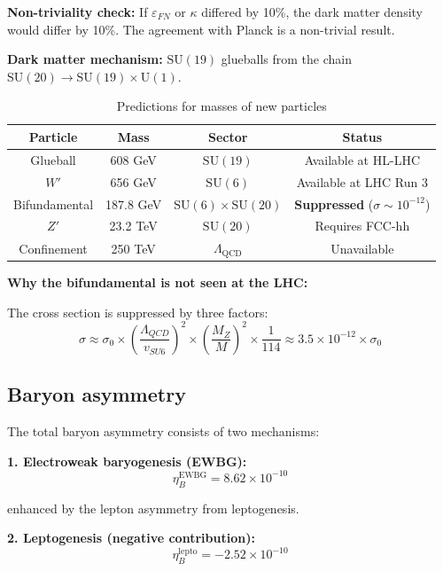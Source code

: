 \documentclass[12pt,a4paper,twoside]{article}
\newcommand{\SU}{\mathrm{SU}}
\newcommand{\Uone}{\mathrm{U}(1)}
\newcommand{\EPS}{\varepsilon}
\theoremstyle{definition}
\begin{document}
\textbf{Non-triviality check:} If $\EPS_{FN}$ or $\kappa$ differed by 10\%, the dark matter density would differ by 10\%. The agreement with Planck is a non-trivial result.

\textbf{Dark matter mechanism:} $\SU(19)$ glueballs from the chain $\SU(20) \to \SU(19) \times \Uone$.

\begin{table}[H]
\centering
\small
\caption{Predictions for masses of new particles}
\label{tab:new_particles}
\begin{tabular}{c|c|c|c}
\toprule
\textbf{Particle} & \textbf{Mass} & \textbf{Sector} & \textbf{Status} \\
\midrule
Glueball & 608 GeV & $\SU(19)$ & Available at HL-LHC \\
$W'$ & 656 GeV & $\SU(6)$ & Available at LHC Run 3 \\
Bifundamental & 187.8 GeV & $\SU(6)\times\SU(20)$ & \textbf{Suppressed} ($\sigma \sim 10^{-12}$) \\
$Z'$ & 23.2 TeV & $\SU(20)$ & Requires FCC-hh \\
Confinement & 250 TeV & $\Lambda_{\text{QCD}}$ & Unavailable \\
\bottomrule
\end{tabular}
\end{table}

\textbf{Why the bifundamental is not seen at the LHC:}

The cross section is suppressed by three factors:
\begin{equation}
\sigma \approx \sigma_0 \times \left(\frac{\Lambda_{QCD}}{v_{SU6}}\right)^2 \times \left(\frac{M_Z}{M}\right)^2 \times \frac{1}{114} \approx 3.5 \times 10^{-12} \times \sigma_0
\end{equation}

\subsection{Baryon asymmetry}

The total baryon asymmetry consists of two mechanisms:

\textbf{1. Electroweak baryogenesis (EWBG):}
\begin{equation}
\eta_B^{\text{EWBG}} = 8.62 \times 10^{-10}
\end{equation}

enhanced by the lepton asymmetry from leptogenesis.

\textbf{2. Leptogenesis (negative contribution):}
\begin{equation}
\eta_B^{\text{lepto}} = -2.52 \times 10^{-10}
\end{equation}
\end{document}
